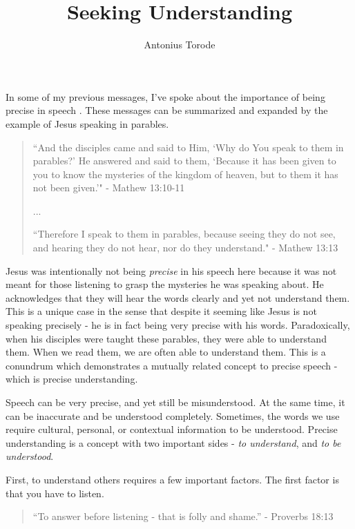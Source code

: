 \documentclass[10pt]{article}
\title{Seeking Understanding}
\author{Antonius Torode}
\begin{document}
\maketitle
\thispagestyle{fancy}

\begin{multicols}{2}

In some of my previous messages, I've spoke about the importance of being precise in speech \cite{Mean What You Say, Precision of Speech}. These messages can be summarized and expanded by the example of Jesus speaking in parables.

\begin{quotation}
``And the disciples came and said to Him, `Why do You speak to them in parables?' He answered and said to them, `Because it has been given to you to know the mysteries of the kingdom of heaven, but to them it has not been given.'" - Mathew 13:10-11

...

``Therefore I speak to them in parables, because seeing they do not see, and hearing they do not hear, nor do they understand." - Mathew 13:13
\end{quotation}
 
Jesus was intentionally not being \textit{precise} in his speech here because it was not meant for those listening to grasp the mysteries he was speaking about. He acknowledges that they will hear the words clearly and yet not understand them. This is a unique case in the sense that despite it seeming like Jesus is not speaking precisely - he is in fact being very precise with his words. Paradoxically, when his disciples were taught these parables, they were able to understand them. When we read them, we are often able to understand them. This is a conundrum which demonstrates a mutually related concept to precise speech - which is precise understanding. 

Speech can be very precise, and yet still be misunderstood. At the same time, it can be inaccurate and be understood completely. Sometimes, the words we use require cultural, personal, or contextual information to be understood. Precise understanding is a concept with two important sides - \textit{to understand}, and \textit{to be understood}.

First, to understand others requires a few important factors. The first factor is that you have to listen.

\begin{quotation}
``To answer before listening - that is folly and shame.'' - Proverbs 18:13
\end{quotation}


\end{multicols}
\end{document}
